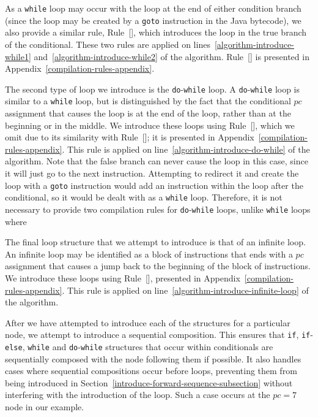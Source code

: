 As a \texttt{while} loop may occur with the loop at the end of either
condition branch (since the loop may be created by a \texttt{goto}
instruction in the Java bytecode), we also provide a similar rule,
Rule~[], which introduces the loop
in the true branch of the conditional.
These two rules are applied on lines~\ref{algorithm-introduce-while1}
and~\ref{algorithm-introduce-while2} of the algorithm.
Rule~[] is presented in
Appendix~\ref{compilation-rules-appendix}.

The second type of loop we introduce is the \texttt{do}-\texttt{while}
loop.
A \texttt{do}-\texttt{while} loop is similar to a \texttt{while} loop,
but is distinguished by the fact that the conditional $pc$ assignment
that causes the loop is at the end of the loop, rather than at the
beginning or in the middle.
We introduce these loops using
Rule~[], which we omit due to its
similarity with Rule~[]; it is
presented in Appendix~\ref{compilation-rules-appendix}.
This rule is applied on line~\ref{algorithm-introduce-do-while} of the
algorithm.
Note that the false branch can never cause the loop in this case,
since it will just go to the next instruction.
Attempting to redirect it and create the loop with a \texttt{goto}
instruction would add an instruction within the loop after the
conditional, so it would be dealt with as a \texttt{while} loop.
Therefore, it is not necessary to provide two compilation rules for
\texttt{do}-\texttt{while} loops, unlike \texttt{while} loops where

The final loop structure that we attempt to introduce is that of an
infinite loop.
An infinite loop may be identified as a block of instructions that
ends with a $pc$ assignment that causes a jump back to the beginning
of the block of instructions.
We introduce these loops using
Rule~[], presented in
Appendix~\ref{compilation-rules-appendix}.
This rule is applied on line~\ref{algorithm-introduce-infinite-loop}
of the algorithm.

After we have attempted to introduce each of the structures for a
particular node, we attempt to introduce a sequential composition.
This ensures that \texttt{if}, \texttt{if}-\texttt{else},
\texttt{while} and \texttt{do}-\texttt{while} structures that occur
within conditionals are sequentially composed with the node following
them if possible.
It also handles cases where sequential compositions occur before
loops, preventing them from being introduced in
Section~\ref{introduce-forward-sequence-subsection} without
interfering with the introduction of the loop.
Such a case occurs at the $pc=7$ node in our example.

